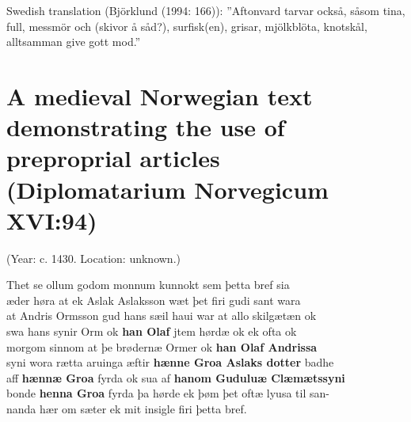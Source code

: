 Swedish translation (Björklund (1994: 166)): ”Aftonvard tarvar också, såsom tina, full, messmör och (skivor å såd?), surfisk(en), grisar, mjölkblöta, knotskål, alltsamman give gott mod.”

\section{A medieval Norwegian text demonstrating the use of preproprial articles (Diplomatarium Norvegicum XVI:94)}

 (Year: c. 1430. Location: unknown.)

Thet se ollum godom monnum kunnokt sem þetta bref sia\\
æder høra at ek Aslak Aslaksson wæt þet firi gudi sant wara\\
at Andris Ormsson gud hans sæil haui war at allo skilgætæn ok\\
swa hans synir Orm ok \textbf{han Olaf} jtem hørdæ ok ek ofta ok\\
morgom sinnom at þe brødernæ Ormer ok \textbf{han Olaf Andrissa}\\
syni wora rætta aruinga æftir \textbf{hænne Groa Aslaks dotter} badhe\\
aff \textbf{hænnæ Groa} fyrda ok sua af \textbf{hanom Guduluæ Clæmætssyni}\\
bonde \textbf{henna Groa} fyrda þa hørde ek þøm þet oftæ lyusa til san-\\
nanda hær om sæter ek mit insigle firi þetta bref.
